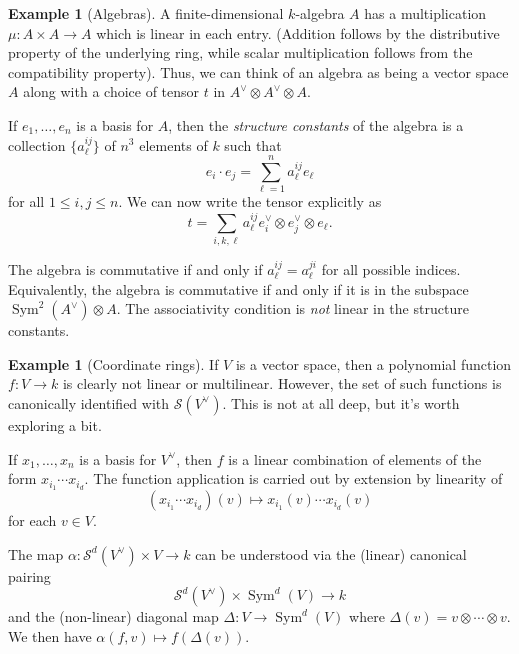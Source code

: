 \documentclass[12pt]{article}
\theoremstyle{plain}
\theoremstyle{definition}
\newtheorem{example}[theorem]{Example}
\theoremstyle{remark}
\numberwithin{equation}{section}
\begin{document}
\begin{example}[Algebras]
A finite-dimensional $k$-algebra $A$ has a multiplication $\mu: A \times
A \to A$ which is linear in each entry.
(Addition follows by the distributive property of the underlying ring,
while scalar multiplication follows from the compatibility property).
Thus, we can think of an algebra as being a vector space $A$
along with a choice of tensor $t$ in $A^\vee \otimes A^\vee \otimes A$.

If $e_1,\ldots,e_n$ is a basis for $A$,
then the \emph{structure constants} of the algebra
is a collection $\{ a^{ij}_\ell\}$ of $n^3$ elements of $k$ such that
\[
e_i\cdot e_j = \sum_{\ell=1}^n a^{ij}_\ell e_\ell
\]
for all $1 \le i,j \le n$.
We can now write the tensor explicitly as
\[
t = \sum_{i,k,\ell} a^{ij}_\ell e_i^\vee \otimes e_j^\vee \otimes
e_\ell.
\]

The algebra is commutative if and only if $a^{ij}_\ell=a^{ji}_\ell$
for all possible indices.  Equivalently, the algebra is commutative if
and only if it is in the subspace $\operatorname{Sym}^2(A^\vee) \otimes A$.
The associativity condition is \emph{not} linear in the structure
constants. 
\end{example}

\begin{example}[Coordinate rings]
If $V$ is a vector space, then a polynomial function $f: V \to k$
is clearly not linear or multilinear.  However, the set of such
functions is canonically identified with $\mathcal{S}(V^\vee)$.
This is not at all deep, but it's worth exploring a bit.

If $x_1,\ldots,x_n$ is a basis for $V^\vee$, then
$f$ is a linear combination of elements of the form
$x_{i_1}\cdots x_{i_d}$.  The function application is carried out
by extension by linearity of
\[
(x_{i_1}\cdots x_{i_d})(v) \mapsto x_{i_1}(v)\cdots x_{i_d}(v)
\]
for each $v \in V$.

The map $\alpha : \mathcal{S}^d(V^\vee) \times V \to k$
can be understood via the (linear) canonical pairing
\[
\mathcal{S}^d(V^\vee) \times \operatorname{Sym}^d(V) \to k
\]
and the (non-linear)
diagonal map $\Delta: V \to \operatorname{Sym}^d(V)$
where $\Delta(v) = v \otimes \cdots \otimes v$.
We then have $\alpha(f,v) \mapsto f(\Delta(v))$.
\end{example}
\end{document}
